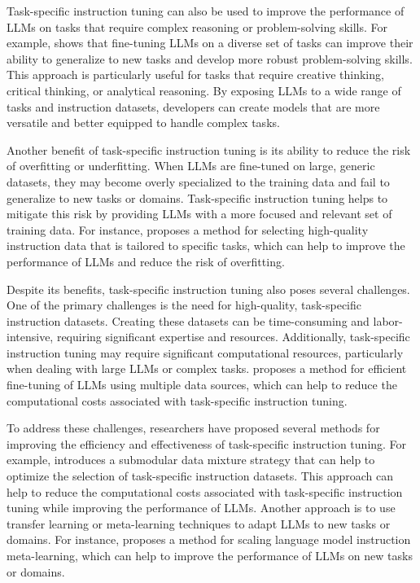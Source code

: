 \documentclass[11pt]{article}
\begin{document}
Task-specific instruction tuning can also be used to improve the performance of LLMs on tasks that require complex reasoning or problem-solving skills. For example, \cite{ref88} shows that fine-tuning LLMs on a diverse set of tasks can improve their ability to generalize to new tasks and develop more robust problem-solving skills. This approach is particularly useful for tasks that require creative thinking, critical thinking, or analytical reasoning. By exposing LLMs to a wide range of tasks and instruction datasets, developers can create models that are more versatile and better equipped to handle complex tasks.

Another benefit of task-specific instruction tuning is its ability to reduce the risk of overfitting or underfitting. When LLMs are fine-tuned on large, generic datasets, they may become overly specialized to the training data and fail to generalize to new tasks or domains. Task-specific instruction tuning helps to mitigate this risk by providing LLMs with a more focused and relevant set of training data. For instance, \cite{ref16} proposes a method for selecting high-quality instruction data that is tailored to specific tasks, which can help to improve the performance of LLMs and reduce the risk of overfitting.

Despite its benefits, task-specific instruction tuning also poses several challenges. One of the primary challenges is the need for high-quality, task-specific instruction datasets. Creating these datasets can be time-consuming and labor-intensive, requiring significant expertise and resources. Additionally, task-specific instruction tuning may require significant computational resources, particularly when dealing with large LLMs or complex tasks. \cite{ref89} proposes a method for efficient fine-tuning of LLMs using multiple data sources, which can help to reduce the computational costs associated with task-specific instruction tuning.

To address these challenges, researchers have proposed several methods for improving the efficiency and effectiveness of task-specific instruction tuning. For example, \cite{ref35} introduces a submodular data mixture strategy that can help to optimize the selection of task-specific instruction datasets. This approach can help to reduce the computational costs associated with task-specific instruction tuning while improving the performance of LLMs. Another approach is to use transfer learning or meta-learning techniques to adapt LLMs to new tasks or domains. For instance, \cite{ref90} proposes a method for scaling language model instruction meta-learning, which can help to improve the performance of LLMs on new tasks or domains.
\end{document}
